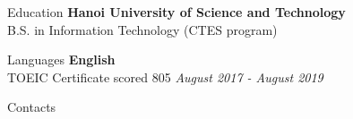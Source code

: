 \documentclass{resume}
\begin{document}
  \newpage

  \begin{rSection}{Education}
    {\bf Hanoi University of Science and Technology} \\ 
    { B.S. in Information Technology (CTES program) } \\
  \end{rSection}


  \begin{rSection}{Languages}
    {\bf English} \\ 
    { TOEIC Certificate scored 805  } \hfill {\em August 2017 - August 2019} \\
  \end{rSection}

  \begin{rSection}{Contacts}
  \end{rSection}
\end{document}
